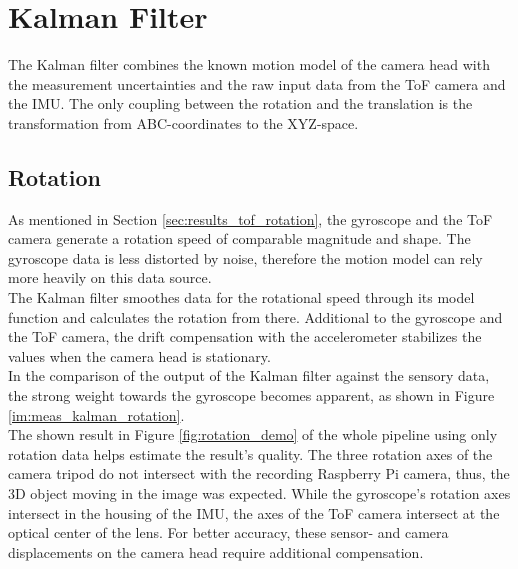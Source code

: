 \section{Kalman Filter}
\label{sec:kalman_results}
The Kalman filter combines the known motion model of the camera head with the measurement uncertainties and the raw input data from the ToF camera and the IMU. The only coupling between the rotation and the translation is the transformation from ABC-coordinates to the XYZ-space.
\subsection{Rotation}
\label{sec:kalman_rotation_results}
As mentioned in Section \ref{sec:results_tof_rotation}, the gyroscope and the ToF camera generate a rotation speed of comparable magnitude and shape. The gyroscope data is less distorted by noise, therefore the motion model can rely more heavily on this data source.\\
The Kalman filter smoothes data for the rotational speed through its model function and calculates the rotation from there. Additional to the gyroscope and the ToF camera, the drift compensation with the accelerometer stabilizes the values when the camera head is stationary.\\ 
In the comparison of the output of the Kalman filter against the sensory data, the strong weight towards the gyroscope becomes apparent, as shown in Figure \ref{im:meas_kalman_rotation}.\\
The shown result in Figure \ref{fig:rotation_demo} of the whole pipeline using only rotation data helps estimate the result's quality. The three rotation axes of the camera tripod do not intersect with the recording Raspberry Pi camera, thus, the 3D object moving in the image was expected. While the gyroscope's rotation axes intersect in the housing of the IMU, the axes of the ToF camera intersect at the optical center of the lens. For better accuracy, these sensor- and camera displacements on the camera head require additional compensation. 
